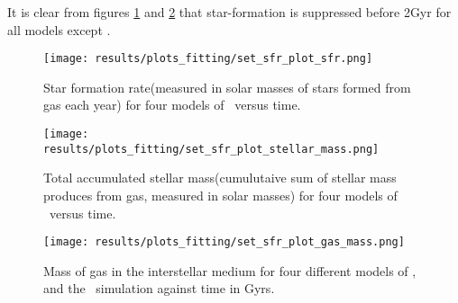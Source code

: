 It is clear from figures \ref{img:fit-v0-sfr} and \ref{img:fit-v0-stellarmass} that star-formation is suppressed before 2Gyr for all models except \vanillaomega.

\begin{figure}[h]
  \centering
  \texttt{[image: results/plots\_fitting/set\_sfr\_plot\_sfr.png]}
  \caption[Star formation rate in \omegamodel\ for \insertion-fitting]{\label{img:fit-v0-sfr}
    Star formation rate(measured in solar masses of stars formed from gas each year) for four models of \omegamodel\ versus time. 
  }
\end{figure}
\begin{figure}[h]
  \centering
  \texttt{[image: results/plots\_fitting/set\_sfr\_plot\_stellar\_mass.png]}
  \caption[Stellar mass in \omegamodel\ for \insertion-fitting]{\label{img:fit-v0-stellarmass}
    Total accumulated stellar mass(cumulutaive sum of stellar mass produces from gas, measured in solar masses) for four models of \omegamodel\ versus time.
  }
\end{figure}
\begin{figure}[h]
  \centering
  \texttt{[image: results/plots\_fitting/set\_sfr\_plot\_gas\_mass.png]}
  \caption[Gas mass in \omegamodel for \insertion-fitting]{\label{img:fit-v0-gasmass}
    Mass of gas in the interstellar medium for four different models of \omegamodel, and the \eris\ simulation against time in Gyrs.
  }
\end{figure}

